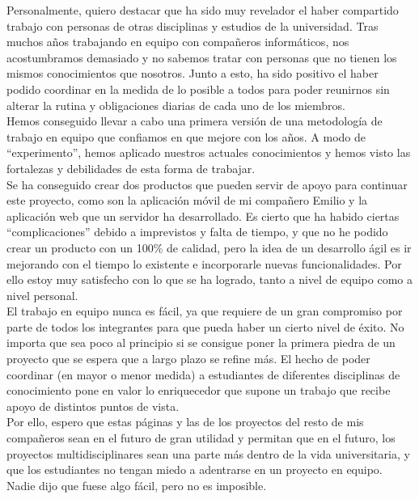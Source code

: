 Personalmente, quiero destacar que ha sido muy revelador el haber compartido trabajo con personas de otras disciplinas y estudios de la universidad. Tras muchos años trabajando en equipo con compañeros informáticos, nos acostumbramos demasiado y no sabemos tratar con personas que no tienen los mismos conocimientos que nosotros. Junto a esto, ha sido positivo el haber podido coordinar en la medida de lo posible a todos para poder reunirnos sin alterar la rutina y obligaciones diarias de cada uno de los miembros.\\

Hemos conseguido llevar a cabo una primera versión de una metodología de trabajo en equipo que confiamos en que mejore con los años. A modo de ``experimento'', hemos aplicado nuestros actuales conocimientos y hemos visto las fortalezas y debilidades de esta forma de trabajar.\\

Se ha conseguido crear dos productos que pueden servir de apoyo para continuar este proyecto, como son la aplicación móvil de mi compañero Emilio y la aplicación web que un servidor ha desarrollado. Es cierto que ha habido ciertas ``complicaciones'' debido a imprevistos y falta de tiempo, y que no he podido crear un producto con un 100\% de calidad, pero la idea de un desarrollo ágil es ir mejorando con el tiempo lo existente e incorporarle nuevas funcionalidades. Por ello estoy muy satisfecho con lo que se ha logrado, tanto a nivel de equipo como a nivel personal.\\

El trabajo en equipo nunca es fácil, ya que requiere de un gran compromiso por parte de todos los integrantes para que pueda haber un cierto nivel de éxito. No importa que sea poco al principio si se consigue poner la primera piedra de un proyecto que se espera que a largo plazo se refine más. El hecho de poder coordinar (en mayor o menor medida) a estudiantes de diferentes disciplinas de conocimiento pone en valor lo enriquecedor que supone un trabajo que recibe apoyo de distintos puntos de vista.\\

Por ello, espero que estas páginas y las de los proyectos del resto de mis compañeros sean en el futuro de gran utilidad y permitan que en el futuro, los proyectos multidisciplinares sean una parte más dentro de la vida universitaria, y que los estudiantes no tengan miedo a adentrarse en un proyecto en equipo. Nadie dijo que fuese algo fácil, pero no es imposible.

